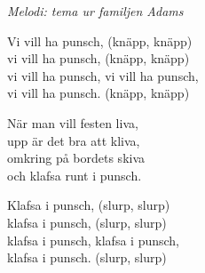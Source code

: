 {\footnotesize\textit{Melodi: tema ur familjen Adams}}\par
\vspace{10pt}
Vi vill ha punsch, (knäpp, knäpp)\\
vi vill ha punsch, (knäpp, knäpp)\\
vi vill ha punsch, vi vill ha punsch,\\
vi vill ha punsch. (knäpp, knäpp)\par
\vspace{10pt}
När man vill festen liva,\\
upp är det bra att kliva,\\
omkring på bordets skiva\\
och klafsa runt i punsch.\par
\vspace{10pt}
Klafsa i punsch, (slurp, slurp)\\
klafsa i punsch, (slurp, slurp)\\
klafsa i punsch, klafsa i punsch,\\
klafsa i punsch. (slurp, slurp)
